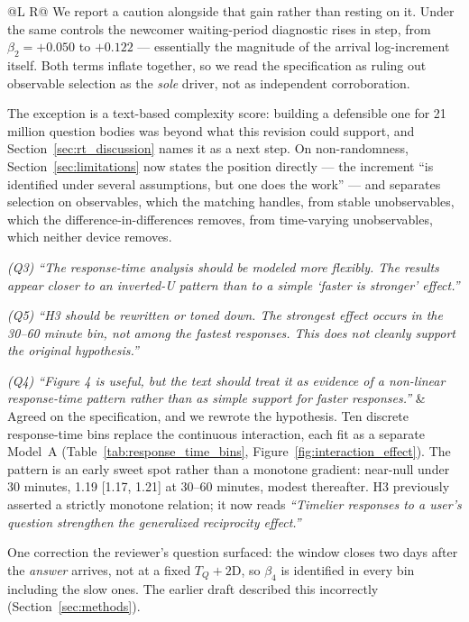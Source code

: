 \documentclass[11pt]{article}
\begin{document}
\begin{longtable}{@{}L R@{}}
We report a caution alongside that gain rather than resting on it. Under the same controls the newcomer waiting-period diagnostic rises in step, from $\beta_2 = +0.050$ to $+0.122$ --- essentially the magnitude of the arrival log-increment itself. Both terms inflate together, so we read the specification as ruling out observable selection as the \emph{sole} driver, not as independent corroboration.

The exception is a text-based complexity score: building a defensible one for 21 million question bodies was beyond what this revision could support, and Section~\ref{sec:rt_discussion} names it as a next step. On non-randomness, Section~\ref{sec:limitations} now states the position directly --- the increment ``is identified under several assumptions, but one does the work'' --- and separates selection on observables, which the matching handles, from stable unobservables, which the difference-in-differences removes, from time-varying unobservables, which neither device removes. \\
\midrule

\textit{(Q3) ``The response-time analysis should be modeled more flexibly. The results appear closer to an inverted-U pattern than to a simple `faster is stronger' effect.''}

\textit{(Q5) ``H3 should be rewritten or toned down. The strongest effect occurs in the 30--60 minute bin, not among the fastest responses. This does not cleanly support the original hypothesis.''}

\textit{(Q4) ``Figure 4 is useful, but the text should treat it as evidence of a non-linear response-time pattern rather than as simple support for faster responses.''} &
Agreed on the specification, and we rewrote the hypothesis. Ten discrete response-time bins replace the continuous interaction, each fit as a separate Model~A (Table~\ref{tab:response_time_bins}, Figure~\ref{fig:interaction_effect}). The pattern is an early sweet spot rather than a monotone gradient: near-null under 30 minutes, 1.19 [1.17, 1.21] at 30--60 minutes, modest thereafter. H3 previously asserted a strictly monotone relation; it now reads \emph{``Timelier responses to a user's question strengthen the generalized reciprocity effect.''}

One correction the reviewer's question surfaced: the window closes two days after the \emph{answer} arrives, not at a fixed $T_Q + 2\text{D}$, so $\beta_4$ is identified in every bin including the slow ones. The earlier draft described this incorrectly (Section~\ref{sec:methods}).


\end{longtable}
\end{document}
